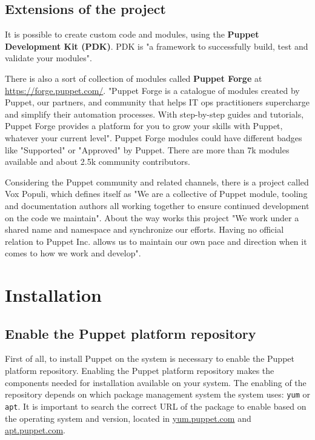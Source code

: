 \documentclass[12pt,a4paper,openright,twoside]{book}
\begin{document}
\subsection{Extensions of the project}
It is possible to create custom code and modules, using the \textbf{Puppet Development Kit (PDK)}.
PDK is "a framework to successfully build, test and validate your modules"\cite{puppetDocPDK}.


There is also a sort of collection of modules called \textbf{Puppet Forge} at \url{https://forge.puppet.com/}.
"Puppet Forge is a catalogue of modules created by Puppet, our partners, and community that helps IT ops practitioners supercharge and simplify their automation processes. With step-by-step guides and tutorials, Puppet Forge provides a platform for you to grow your skills with Puppet, whatever your current level"\cite{puppetForge}.
Puppet Forge modules could have different badges like "Supported" or "Approved" by Puppet.
There are more than 7k modules available and about 2.5k community contributors.

Considering the Puppet community and related channels, there is a project called Vox Populi, which defines itself as "We are a collective of Puppet module, tooling and documentation authors all working together to ensure continued development on the code we maintain"\cite{puppetVox}.
About the way works this project "We work under a shared name and namespace and synchronize our efforts. Having no official relation to Puppet Inc. allows us to maintain our own pace and direction when it comes to how we work and develop"\cite{puppetVox}.

\section{Installation}

\subsection{Enable the Puppet platform repository}
First of all, to install Puppet on the system is necessary to enable the Puppet platform repository.
Enabling the Puppet platform repository makes the components needed for installation available on your system.
The enabling of the repository depends on which package management system the system uses: \texttt{yum} or \texttt{apt}.
It is important to search the correct URL of the package to enable based on the operating system and version, located in \url{yum.puppet.com} and \url{apt.puppet.com}.
\cite{puppetDocInstall}
\end{document}

